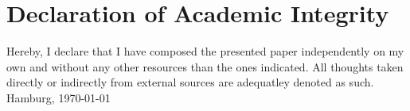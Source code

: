 \chapter*{Declaration of Academic Integrity}

Hereby, I declare that I have composed the presented paper independently on my own and without any other resources than the ones indicated. All thoughts taken directly or indirectly from external sources are adequatley denoted as such.
\\[2em]
Hamburg, \today
\\[8em]
\theauthor

\newpage